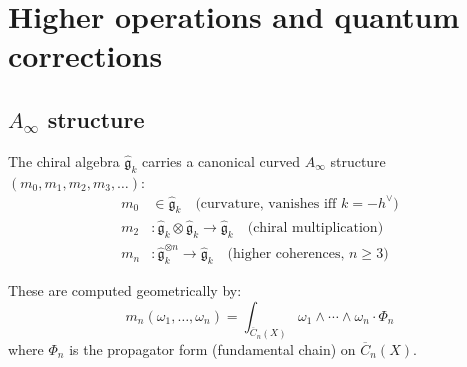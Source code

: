 \section{Higher operations and quantum corrections}

\subsection{\texorpdfstring{$A_\infty$ structure}{A- structure}}

\begin{theorem}\label{thm:kac-moody-ainfty}
The chiral algebra $\widehat{\mathfrak{g}}_k$ carries a canonical curved $A_\infty$ structure $(m_0, m_1, m_2, m_3, \ldots)$:
\begin{align}
m_0 &\in \widehat{\mathfrak{g}}_k \quad \text{(curvature, vanishes iff } k = -h^\vee\text{)} \\
m_2 &: \widehat{\mathfrak{g}}_k \otimes \widehat{\mathfrak{g}}_k \to \widehat{\mathfrak{g}}_k \quad \text{(chiral multiplication)} \\
m_n &: \widehat{\mathfrak{g}}_k^{\otimes n} \to \widehat{\mathfrak{g}}_k \quad \text{(higher coherences, } n \geq 3\text{)}
\end{align}

These are computed geometrically by:
\begin{equation}
m_n(\omega_1, \ldots, \omega_n) = \int_{\overline{C}_n(X)} \omega_1 \wedge \cdots \wedge \omega_n \cdot \Phi_n
\end{equation}
where $\Phi_n$ is the propagator form (fundamental chain) on $\overline{C}_n(X)$.
\end{theorem}

